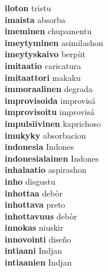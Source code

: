 \textbf{iloton } tristu \\
\textbf{imaista } absorba \\
\textbf{imeminen } chupamentu \\
\textbf{imeytyminen } asimilashon \\
\textbf{imeytyskaivo } berpùt \\
\textbf{imitaatio } caricatura \\
\textbf{imitaattori } makaku \\
\textbf{immoraalinen } degrada \\
\textbf{improvisoida } improvisá \\
\textbf{improvisoitu } improvisá \\
\textbf{impulsiivinen } kaprichoso \\
\textbf{imukyky } absorbacion \\
\textbf{indonesia } Indones \\
\textbf{indonesialainen } Indones \\
\textbf{inhalaatio } aspirashon \\
\textbf{inho } disgustu \\
\textbf{inhottaa } debòr \\
\textbf{inhottava } preto \\
\textbf{inhottavuus } debòr \\
\textbf{innokas } niuskir \\
\textbf{innovointi } diseño \\
\textbf{intiaani } Indjan \\
\textbf{intiaanien } Indjan \\
